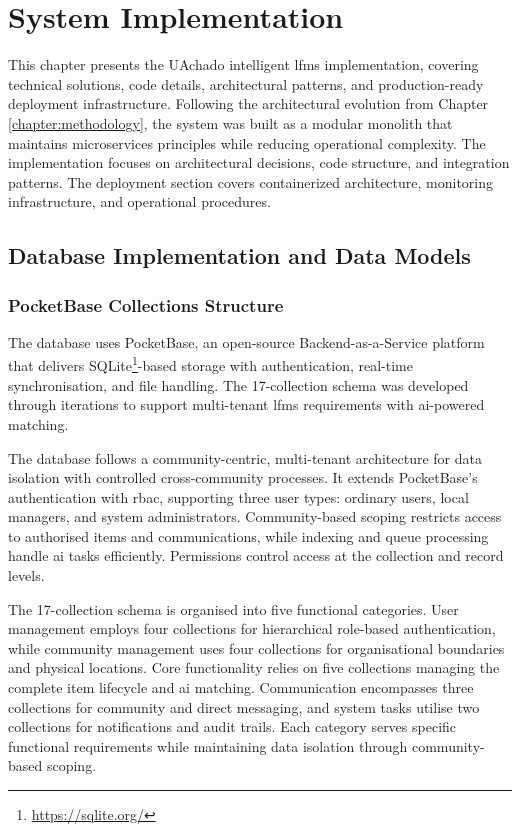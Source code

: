 \chapter{System Implementation} \label{chapter:implementation}

This chapter presents the UAchado intelligent \ac{lfms} implementation, covering technical solutions, code details, architectural patterns, and production-ready deployment infrastructure. Following the architectural evolution from Chapter \ref{chapter:methodology}, the system was built as a modular monolith that maintains microservices principles while reducing operational complexity. The implementation focuses on architectural decisions, code structure, and integration patterns. The deployment section covers containerized architecture, monitoring infrastructure, and operational procedures.


\section{Database Implementation and Data Models} \label{section:database_implementation}

\subsection{PocketBase Collections Structure} \label{subsection:pocketbase_collections}

The database uses PocketBase, an open-source Backend-as-a-Service platform that delivers SQLite\footnote{\url{https://sqlite.org/}}-based storage with authentication, real-time synchronisation, and file handling. The 17-collection schema was developed through iterations to support multi-tenant \ac{lfms} requirements with \ac{ai}-powered matching.

The database follows a community-centric, multi-tenant architecture for data isolation with controlled cross-community processes. It extends PocketBase's authentication with \ac{rbac}, supporting three user types: ordinary users, local managers, and system administrators. Community-based scoping restricts access to authorised items and communications, while indexing and queue processing handle \ac{ai} tasks efficiently. Permissions control access at the collection and record levels.

The 17-collection schema is organised into five functional categories. User management employs four collections for hierarchical role-based authentication, while community management uses four collections for organisational boundaries and physical locations. Core functionality relies on five collections managing the complete item lifecycle and \ac{ai} matching. Communication encompasses three collections for community and direct messaging, and system tasks utilise two collections for notifications and audit trails. Each category serves specific functional requirements while maintaining data isolation through community-based scoping.

